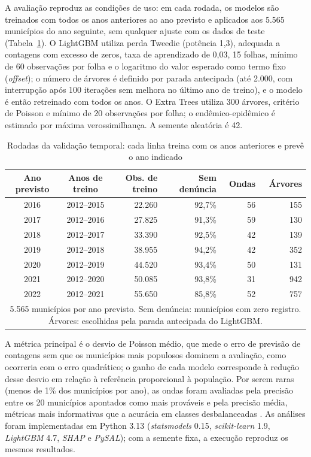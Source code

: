 \documentclass[12pt]{article}
\begin{document}
A avaliação reproduz as condições de uso: em cada rodada, os modelos são treinados com todos os anos anteriores ao ano previsto e aplicados aos 5.565 municípios do ano seguinte, sem qualquer ajuste com os dados de teste (Tabela~\ref{tab:rodadas}). O LightGBM utiliza perda Tweedie (potência 1,3), adequada a contagens com excesso de zeros, taxa de aprendizado de 0,03, 15 folhas, mínimo de 60 observações por folha e o logaritmo do valor esperado como termo fixo (\textit{offset}); o número de árvores é definido por parada antecipada (até 2.000, com interrupção após 100 iterações sem melhora no último ano de treino), e o modelo é então retreinado com todos os anos. O Extra Trees utiliza 300 árvores, critério de Poisson e mínimo de 20 observações por folha; o endêmico-epidêmico é estimado por máxima verossimilhança. A semente aleatória é 42.

\begin{table}[H]
\centering
\caption{Rodadas da validação temporal: cada linha treina com os anos anteriores e prevê o ano indicado}
\label{tab:rodadas}
{\renewcommand{\arraystretch}{1.0}\footnotesize
\begin{tabular}{c c r r r r}
\toprule
\textbf{Ano previsto} & \textbf{Anos de treino} & \textbf{Obs. de treino} & \textbf{Sem denúncia} & \textbf{Ondas} & \textbf{Árvores} \\
\midrule
2016 & 2012--2015 & 22.260 & 92,7\% & 56 & 155 \\
2017 & 2012--2016 & 27.825 & 91,3\% & 59 & 130 \\
2018 & 2012--2017 & 33.390 & 92,5\% & 42 & 139 \\
2019 & 2012--2018 & 38.955 & 94,2\% & 42 & 352 \\
2020 & 2012--2019 & 44.520 & 93,4\% & 50 & 131 \\
2021 & 2012--2020 & 50.085 & 93,8\% & 31 & 942 \\
2022 & 2012--2021 & 55.650 & 85,8\% & 52 & 757 \\
\bottomrule
\multicolumn{6}{p{12.5cm}}{\footnotesize 5.565 municípios por ano previsto. Sem denúncia: municípios com zero registro. Árvores: escolhidas pela parada antecipada do LightGBM.}
\end{tabular}}
\end{table}

A métrica principal é o desvio de Poisson médio, que mede o erro de previsão de contagens sem que os municípios mais populosos dominem a avaliação, como ocorreria com o erro quadrático; o ganho de cada modelo corresponde à redução desse desvio em relação à referência proporcional à população. Por serem raras (menos de 1\% dos municípios por ano), as ondas foram avaliadas pela precisão entre os 20 municípios apontados como mais prováveis e pela precisão média, métricas mais informativas que a acurácia em classes desbalanceadas \cite{saito_rehmsmeier:2015}. As análises foram implementadas em Python 3.13 (\textit{statsmodels} 0.15, \textit{scikit-learn} 1.9, \textit{LightGBM} 4.7, \textit{SHAP} e \textit{PySAL}); com a semente fixa, a execução reproduz os mesmos resultados.
\end{document}
